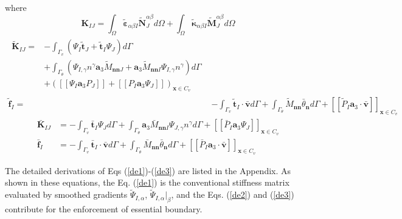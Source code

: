 where
\begin{equation}\label{de1}
        \boldsymbol K_{IJ} = \int_\Omega \tilde{\boldsymbol \varepsilon}_{\alpha\beta I} \tilde{\boldsymbol N}^{\alpha\beta}_J d\Omega + \int_\Omega \tilde{\boldsymbol \kappa}_{\alpha\beta I} \tilde{\boldsymbol M}^{\alpha\beta}_J d\Omega
\end{equation}
\begin{subequations}\label{de2}
\begin{align}
\begin{split}
        \tilde{\boldsymbol K}_{IJ} = &- \int_{\Gamma_v} (\Psi_I \tilde{\boldsymbol t}_J + \tilde{\boldsymbol t}_I \Psi_J) d\Gamma \\
                                     &+ \int_{\Gamma_\theta} (\Psi_{I,\gamma} n^\gamma \boldsymbol a_3 \tilde M_{\boldsymbol{nn}J} + \boldsymbol a_3 \tilde M_{\boldsymbol{nn}I} \Psi_{I,\gamma}n^\gamma)d\Gamma \\
                                     & + ([[\Psi_I \boldsymbol a_3 P_J]] + [[P_I \boldsymbol a_3 \Psi_J]])_{\boldsymbol x \in C_v}
\end{split} \\
\tilde{\boldsymbol f}_I = &- \int_{\Gamma_v} \tilde{\boldsymbol t}_I \cdot \bar{\boldsymbol v} d\Gamma + \int_{\Gamma_\theta} \tilde M_{\boldsymbol{nn}} \bar{\theta}_{\boldsymbol n} d\Gamma + [[\tilde P_I\boldsymbol a_3 \cdot \bar{\boldsymbol v}]]_{\boldsymbol x \in C_v}
\end{align}
\end{subequations}
\begin{subequations}\label{de3}
\begin{align}
\bar{\boldsymbol K}_{IJ} &= - \int_{\Gamma_v} \bar{\boldsymbol t}_I \Psi_J d\Gamma 
+ \int_{\Gamma_\theta} \boldsymbol a_3\bar M_{\boldsymbol{nn}I} \Psi_{J,\gamma}n^\gamma d\Gamma + [[\bar P_I \boldsymbol a_3 \Psi_J]]_{\boldsymbol x \in C_v} \\
\bar{\boldsymbol f}_I &= - \int_{\Gamma_v} \bar{\boldsymbol t}_I \cdot \bar{\boldsymbol v} d\Gamma + \int_{\Gamma_\theta} \bar M_{\boldsymbol{nn}} \bar{\theta}_{\boldsymbol n} d\Gamma + [[\bar P_I\boldsymbol a_3 \cdot \bar{\boldsymbol v}]]_{\boldsymbol x \in C_v}
\end{align}
\end{subequations}

The detailed derivations of Eqs (\ref{de1})-(\ref{de3}) are listed in the Appendix. As shown in these equations, the Eq. (\ref{de1}) is the conventional stiffness matrix evaluated by smoothed gradients $\tilde \Psi_{I,\alpha}$, $\tilde \Psi_{I,\alpha}\vert_\beta$, and the Eqs. (\ref{de2}) and (\ref{de3}) contribute for the enforcement of essential boundary. 

